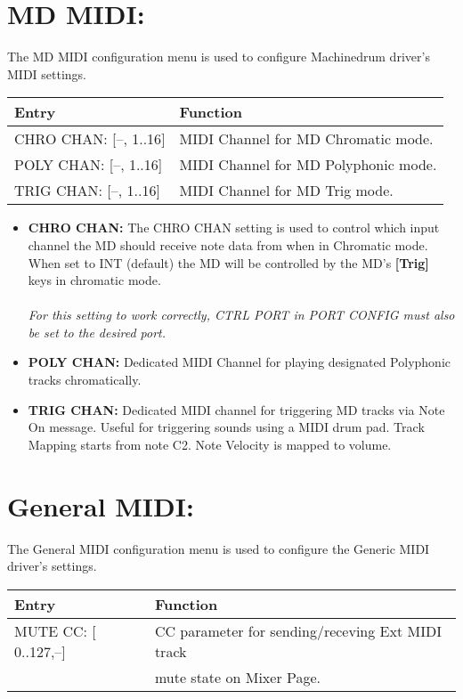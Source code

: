\newpage

\section{MD MIDI:}
The MD MIDI configuration menu is used to configure Machinedrum driver's MIDI settings.
\\
\begin{tabular}{|l|l|}
\hline
\rowcolor[HTML]{C0C0C0} 
Entry                                  & Function                                                                       \\ \hline
CHRO CHAN: {[}--, 1..16{]}        & MIDI Channel for MD Chromatic mode. \\ \hline
POLY CHAN: {[}--, 1..16{]}         & MIDI Channel for MD Polyphonic mode. \\ \hline
TRIG CHAN: {[}--, 1..16{]}        & MIDI Channel for MD Trig mode. \\ \hline
\end{tabular}

\begin{itemize}
\item{\textbf{CHRO CHAN:} The CHRO CHAN setting is used to control which input channel the MD should receive note data from when in Chromatic mode. When set to INT (default) the MD will be controlled by the MD's \textbf{[Trig]} keys in chromatic mode. \\\\\textit{For this setting to work correctly, CTRL PORT in PORT CONFIG must also be set to the desired port.}}

\item{\textbf{POLY CHAN:} Dedicated MIDI Channel for playing designated Polyphonic tracks chromatically.}
\item{\textbf{TRIG CHAN:} Dedicated MIDI channel for triggering MD tracks via Note On message. Useful for triggering sounds using a MIDI drum pad. Track Mapping starts from note C2. Note Velocity is mapped to volume.}
\end{itemize}

\section{General MIDI:}
The General MIDI configuration menu is used to configure the Generic MIDI driver's settings.
\\
\begin{tabular}{|l|l|}
\hline
\rowcolor[HTML]{C0C0C0} 
Entry                                  & Function                                                                       \\ \hline
MUTE CC: {[} 0..127,--{]}        & CC parameter for sending/receving Ext MIDI track\\& mute state on Mixer Page. \\ 
\hline
\end{tabular}
